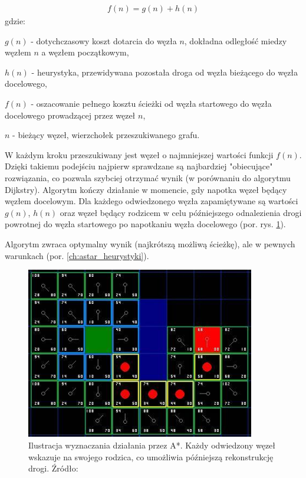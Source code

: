 \begin{gather}
 	f(n) = g(n) + h(n)
 	\label{eq_astar} 
\end{gather}
 gdzie:

 $g(n)$ - dotychczasowy koszt dotarcia do węzła $n$, dokładna odległość miedzy węzłem $n$ a węzłem początkowym,

 $h(n)$ - heurystyka, przewidywana pozostała droga od węzła bieżącego do węzła docelowego,

 $f(n)$ - oszacowanie pełnego kosztu ścieżki od węzła startowego do węzła docelowego prowadzącej przez węzeł $n$,

 $n$ - bieżący węzeł, wierzchołek przeszukiwanego grafu.

W każdym kroku przeszukiwany jest węzeł o najmniejszej wartości funkcji $f(n)$.
Dzięki takiemu podejściu najpierw sprawdzane są najbardziej "obiecujące" rozwiązania, co pozwala szybciej otrzymać wynik (w porównaniu do algorytmu Dijkstry).
Algorytm kończy działanie w momencie, gdy napotka węzeł będący węzłem docelowym.
Dla każdego odwiedzonego węzła zapamiętywane są wartości $g(n)$, $h(n)$ oraz węzeł będący rodzicem w celu późniejszego odnalezienia drogi powrotnej do węzła startowego po napotkaniu węzła docelowego (por. rys. \ref{fig:image_astar2}).

Algorytm zwraca optymalny wynik (najkrótszą możliwą ścieżkę), ale w pewnych warunkach (por. \ref{ch:astar_heurystyki}).

\begin{figure}
	\centering
	\includegraphics[width=10cm]{img/astar-t7}
	\caption{Ilustracja wyznaczania działania przez A*. Każdy odwiedzony węzeł wskazuje na swojego rodzica, co umożliwia późniejszą rekonstrukcję drogi. Źródło: \cite{astar2}}
	\label{fig:image_astar2}
\end{figure}

